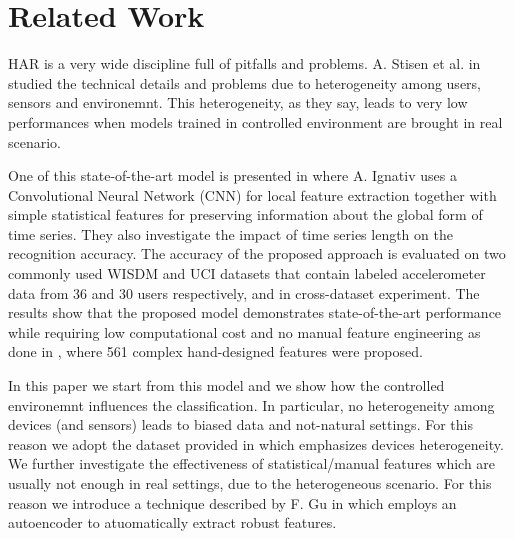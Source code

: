 
\section{Related Work}
\label{sec:related-work}

HAR is a very wide discipline full of pitfalls and problems. A. Stisen
et al. in \cite{stisen2015smart} studied the technical details and
problems due to heterogeneity among users, sensors and
environemnt. This heterogeneity, as they say, leads to very low
performances when models trained in controlled environment are brought
in real scenario.

One of this state-of-the-art model is presented in
\cite{ignatov2018real} where A. Ignativ uses a Convolutional Neural
Network (CNN) for local feature extraction together with simple
statistical features for preserving information about the global form
of time series. They also investigate the impact of time series length
on the recognition accuracy. The accuracy of the proposed approach is
evaluated on two commonly used WISDM and UCI datasets that contain
labeled accelerometer data from 36 and 30 users respectively, and in
cross-dataset experiment. The results show that the proposed model
demonstrates state-of-the-art performance while requiring low
computational cost and no manual feature engineering as done in
\cite{anguita2013public}, where 561 complex hand-designed features
were proposed.

In this paper we start from this model and we show how the controlled
environemnt influences the classification. In particular, no
heterogeneity among devices (and sensors) leads to biased data and
not-natural settings.  For this reason we adopt the dataset provided
in \cite{stisen2015smart} which emphasizes devices heterogeneity.
We further investigate the
effectiveness of statistical/manual features which are usually not
enough in real settings, due to the heterogeneous scenario. For this
reason we introduce a technique described by F. Gu in
\cite{gu2018locomotion} which employs an autoencoder to atuomatically
extract robust features.

